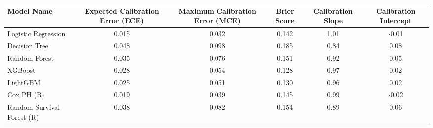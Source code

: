 \begin{tabular}{lccccc}
\toprule
Model Name & Expected Calibration Error (ECE) & Maximum Calibration Error (MCE) & Brier Score & Calibration Slope & Calibration Intercept \\
\midrule
Logistic Regression & 0.015 & 0.032 & 0.142 & 1.01 & -0.01 \\
Decision Tree & 0.048 & 0.098 & 0.185 & 0.84 & 0.08 \\
Random Forest & 0.035 & 0.076 & 0.151 & 0.92 & 0.05 \\
XGBoost & 0.028 & 0.054 & 0.128 & 0.97 & 0.02 \\
LightGBM & 0.025 & 0.051 & 0.130 & 0.96 & 0.02 \\
Cox PH (R) & 0.019 & 0.039 & 0.145 & 0.99 & -0.02 \\
Random Survival Forest (R) & 0.038 & 0.082 & 0.154 & 0.89 & 0.06 \\
\bottomrule
\end{tabular}
